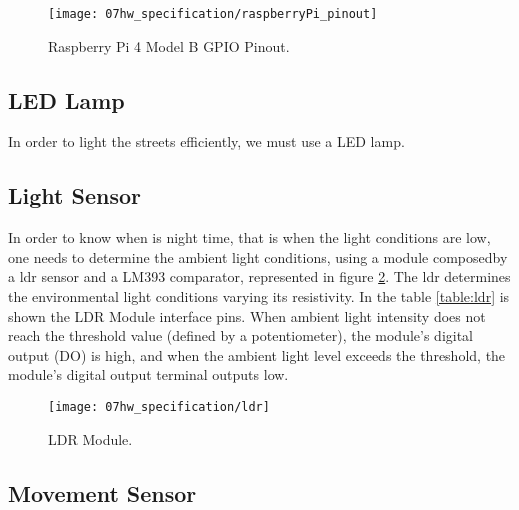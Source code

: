 \begin{figure}[ht]
	\centering
	\texttt{[image: 07hw\_specification/raspberryPi\_pinout]}
	\caption{Raspberry Pi 4 Model B GPIO Pinout.}
	\label{fig:rasp_pinout}
\end{figure}


\subsection{LED Lamp}

In order to light the streets efficiently, we must use a LED lamp. 

\subsection{Light Sensor}

In order to know when is night time, that is when the light conditions are low, one needs to determine the ambient light conditions, using a module composedby a \ac{ldr} sensor and a LM393 comparator, represented in figure \ref{fig:ldr}. The \ac{ldr} determines the environmental light conditions varying its resistivity. In the table \ref{table:ldr} is shown the LDR Module interface pins. When ambient light intensity does not reach the threshold value (defined by a potentiometer), the module's digital output (DO) is high, and when the ambient light level exceeds the threshold, the module's digital output terminal outputs low.

\begin{figure}[ht]
	\centering
	\texttt{[image: 07hw\_specification/ldr]}
	\caption{LDR Module.}
	\label{fig:ldr}
\end{figure}

\begin{table}[H]
	\centering
	
	\caption{LDR Module Interface Pins.}
	\label{table:ldr}
\end{table}

\subsection{Movement Sensor}

